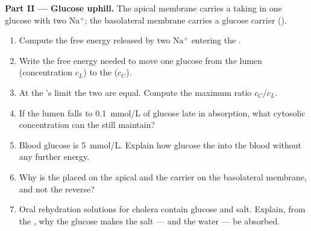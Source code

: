 \begin{problem}
\medskip
\noindent\textbf{Part II --- Glucose uphill.}
The apical membrane carries a  taking in one glucose with two
$\mathrm{Na^+}$; the basolateral membrane carries a glucose carrier
().
\begin{enumerate}[resume]
  \item Compute the free energy released by two $\mathrm{Na^+}$
        entering the .
  \item Write the free energy needed to move one glucose from the
        lumen (concentration $c_L$) to the  ($c_C$).
  \item At the 's limit the two are equal. Compute the maximum
        ratio $c_C/c_L$.
  \item If the lumen falls to \qty{0.1}{mmol/L} of glucose late in
        absorption, what cytosolic concentration can the 
        still maintain?
  \item Blood glucose is \qty{5}{mmol/L}. Explain how glucose 
        the  into the blood without any further energy.
  \item Why is the  placed on the apical and the carrier on
        the basolateral membrane, and not the reverse?
  \item Oral rehydration solutions for cholera contain glucose and
        salt. Explain, from the , why the glucose makes the
        salt --- and the water --- be absorbed.
\end{enumerate}


\end{problem}
